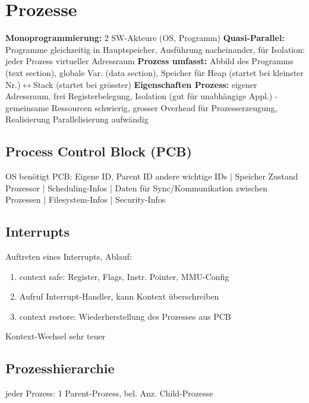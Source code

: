 \section{Prozesse}
\textbf{Monoprogrammierung: }2 SW-Akteure (OS, Programm)
\textbf{Quasi-Parallel: }Programme gleichzeitig in Hauptspeicher, Ausführung nacheinander, für Isolation: jeder Prozess virtueller Adressraum
\textbf{Prozess umfasst: }Abbild des Programms (text section), globale Var. (data section), Speicher für Heap (startet bei kleinster Nr.)$\leftrightarrow$Stack (startet bei grösster) \textbf{Eigenschaften Prozess: }eigener Adressraum, frei Registerbelegung, Isolation (gut für unabhängige Appl.) \textcolor{red}{-} gemeinsame Ressourcen schwierig, grosser Overhead für Prozesserzeugung, Realisierung Parallelisierung aufwändig
\subsection{Process Control Block (PCB)}
OS benötigt PCB: Eigene ID, Parent ID andere wichtige IDs | Speicher Zustand Prozessor | Scheduling-Infos | Daten für Sync/Kommunikation zwischen Prozessen | Filesystem-Infos | Security-Infos

\subsection{Interrupts}
Auftreten eines Interrupts, Ablauf:
\begin{enumerate}
    \item context safe: Register, Flags, Instr. Pointer, MMU-Config
    \item Aufruf Interrupt-Handler, kann Kontext überschreiben
    \item context restore: Wiederherstellung des Prozesses aus PCB
\end{enumerate}
Kontext-Wechsel sehr teuer


\subsection{Prozesshierarchie}
jeder Prozess: 1 Parent-Prozess, bel. Anz. Child-Prozesse

